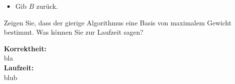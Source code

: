 \documentclass[11pt,a4paper,ngerman]{article}
\begin{document}
\begin{enumerate}[\bfseries (a)]
\begin{itemize}
\item Gib $B$ zurück.

\end{itemize}

Zeigen Sie, dass der gierige Algorithmus eine Basis von maximalem Gewicht bestimmt. Was können Sie zur Laufzeit sagen?

\textbf{Korrektheit:}\\

bla\\

\textbf{Laufzeit:}\\

blub

\end{enumerate}

\label{LastPage}
\end{document}
